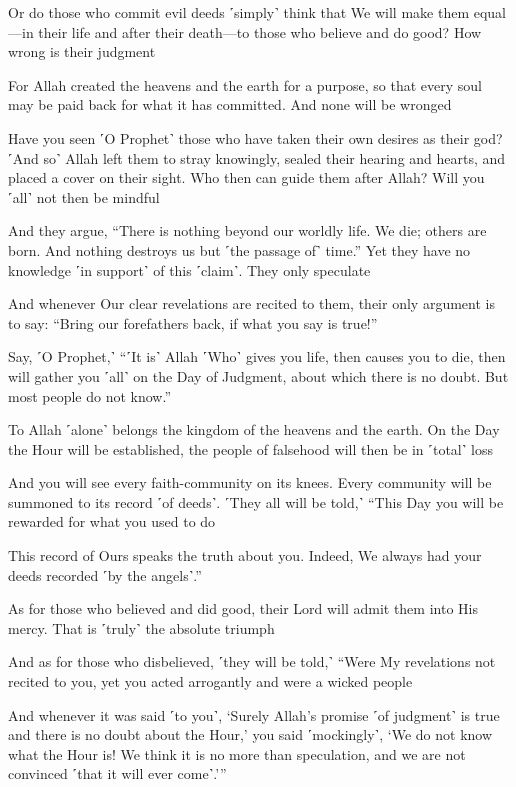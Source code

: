 Or do those who commit evil deeds ˹simply˺ think that We will make them equal—in their life and after their death—to those who believe and do good? How wrong is their judgment

For Allah created the heavens and the earth for a purpose, so that every soul may be paid back for what it has committed. And none will be wronged

Have you seen ˹O Prophet˺ those who have taken their own desires as their god? ˹And so˺ Allah left them to stray knowingly, sealed their hearing and hearts, and placed a cover on their sight. Who then can guide them after Allah? Will you ˹all˺ not then be mindful

And they argue, “There is nothing beyond our worldly life. We die; others are born. And nothing destroys us but ˹the passage of˺ time.” Yet they have no knowledge ˹in support˺ of this ˹claim˺. They only speculate

And whenever Our clear revelations are recited to them, their only argument is to say: “Bring our forefathers back, if what you say is true!”

Say, ˹O Prophet,˺ “˹It is˺ Allah ˹Who˺ gives you life, then causes you to die, then will gather you ˹all˺ on the Day of Judgment, about which there is no doubt. But most people do not know.”

To Allah ˹alone˺ belongs the kingdom of the heavens and the earth. On the Day the Hour will be established, the people of falsehood will then be in ˹total˺ loss

And you will see every faith-community on its knees. Every community will be summoned to its record ˹of deeds˺. ˹They all will be told,˺ “This Day you will be rewarded for what you used to do

This record of Ours speaks the truth about you. Indeed, We always had your deeds recorded ˹by the angels˺.”

As for those who believed and did good, their Lord will admit them into His mercy. That is ˹truly˺ the absolute triumph

And as for those who disbelieved, ˹they will be told,˺ “Were My revelations not recited to you, yet you acted arrogantly and were a wicked people

And whenever it was said ˹to you˺, ‘Surely Allah’s promise ˹of judgment˺ is true and there is no doubt about the Hour,’ you said ˹mockingly˺, ‘We do not know what the Hour is! We think it is no more than speculation, and we are not convinced ˹that it will ever come˺.’”

